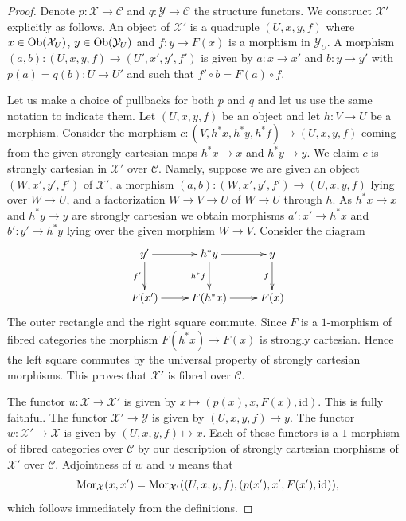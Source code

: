 \begin{proof}
Denote $p : \mathcal{X} \to \mathcal{C}$ and $q : \mathcal{Y} \to \mathcal{C}$
the structure functors. We construct $\mathcal{X}'$ explicitly as follows.
An object of $\mathcal{X}'$ is a quadruple $(U, x, y, f)$ where
$x \in \mathop{\mathrm{Ob}}\nolimits(\mathcal{X}_U)$, $y \in \mathop{\mathrm{Ob}}\nolimits(\mathcal{Y}_U)$
and $f : y \to F(x)$ is a morphism in $\mathcal{Y}_U$.
A morphism $(a, b) : (U, x, y, f) \to (U', x', y', f')$ is given
by $a : x \to x'$ and $b : y \to y'$ with $p(a) = q(b) : U \to U'$
and such that $f' \circ b = F(a) \circ f$.

\medskip\noindent
Let us make a choice of pullbacks for both $p$ and $q$ and let us
use the same notation to indicate them.
Let $(U, x, y, f)$ be an object and let $h : V \to U$ be a morphism.
Consider the morphism $c : (V, h^*x, h^*y, h^*f) \to (U, x, y, f)$
coming from the given strongly cartesian maps $h^*x \to x$ and $h^*y \to y$.
We claim $c$ is strongly cartesian in $\mathcal{X}'$ over $\mathcal{C}$.
Namely, suppose we are given an object $(W, x', y', f')$ of $\mathcal{X}'$,
a morphism $(a, b) : (W, x', y', f') \to (U, x, y, f)$ lying over
$W \to U$, and a factorization $W \to V \to U$ of $W \to U$ through $h$.
As $h^*x \to x$ and $h^*y \to y$ are strongly cartesian we obtain morphisms
$a' : x' \to h^*x$ and $b' : y' \to h^*y$ lying over the given morphism
$W \to V$. Consider the diagram
$$
\xymatrix{
y' \ar[d]_{f'} \ar[r] & h^*y \ar[r] \ar[d]_{h^*f} & y \ar[d]_f \\
F(x') \ar[r] & F(h^*x) \ar[r] & F(x)
}
$$
The outer rectangle and the right square commute.
Since $F$ is a $1$-morphism of fibred categories the morphism
$F(h^*x) \to F(x)$ is strongly cartesian.
Hence the left square commutes by the universal property
of strongly cartesian morphisms. This proves that $\mathcal{X}'$
is fibred over $\mathcal{C}$.

\medskip\noindent
The functor $u : \mathcal{X} \to \mathcal{X}'$ is given by
$x \mapsto (p(x), x, F(x), \text{id})$. This is fully faithful.
The functor $\mathcal{X}' \to \mathcal{Y}$ is given by
$(U, x, y, f) \mapsto y$. The functor $w : \mathcal{X}' \to \mathcal{X}$
is given by $(U, x, y, f) \mapsto x$. Each of these functors is
a $1$-morphism of fibred categories over $\mathcal{C}$ by our
description of strongly cartesian morphisms of $\mathcal{X}'$ over
$\mathcal{C}$. Adjointness of $w$ and $u$ means that
$$
\mathop{\mathrm{Mor}}\nolimits_\mathcal{X}(x, x') =
\mathop{\mathrm{Mor}}\nolimits_{\mathcal{X}'}((U, x, y, f), (p(x'), x', F(x'), \text{id})),
$$
which follows immediately from the definitions.


\end{proof}
